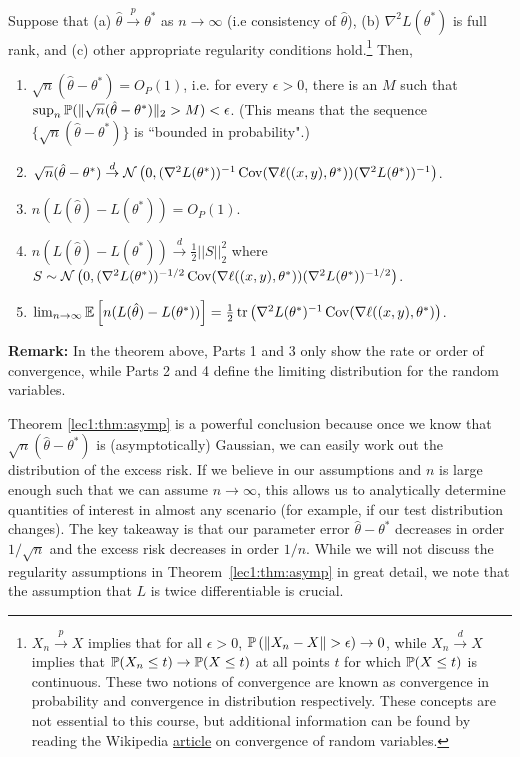 \begin{theorem}
Suppose that (a) $\hat{\theta}  \overset{p}{\to} \theta^{*}$ as $n \to \infty$ (i.e consistency of $\hat{\theta}$), (b) $\nabla^{2}L(\theta^{*})$ is full rank, and  (c) other appropriate regularity conditions hold.\footnote{$X_n \overset{p}{\to} X$ implies that for all $\epsilon > 0$, $\mathbb P \left (\|X_n - X\| > \epsilon \right ) \to 0$, while $X_n \overset{d}{\to} X$ implies that $\mathbb P(X_n \leq t) \to \mathbb P(X \leq t)$ at all points $t$ for which $\mathbb P(X \leq t)$ is continuous. These two notions of convergence are known as convergence in probability and convergence in distribution respectively. These concepts are not essential to this course, but additional information can be found by reading the Wikipedia \href{https://en.wikipedia.org/wiki/Convergence_of_random_variables}{article} on convergence of random variables.} 
Then,
\begin{enumerate}
    \item $\sqrt{n} (\hat{\theta} - \theta^{*}) = O_P(1)$, i.e. for every $\epsilon > 0$, there is an $M$ such that $\sup_n \mathbb P (\| \sqrt{n} (\hat{\theta} - \theta^{*}) \|_2 > M) < \epsilon$. (This means that the sequence $\{ \sqrt{n} (\hat{\theta} - \theta^{*}) \}$ is ``bounded in probability".)
    
    \item  $\sqrt{n}(\hat{\theta}-\theta^{*}) \overset{d}{\to} \mathcal{N} \left(0, (\nabla^{2}L(\theta^{*}))^{-1}\operatorname{Cov}(\nabla \ell((x,y), \theta^*)) (\nabla^{2}L(\theta^{*}))^{-1} \right)$.
     \item $n (L(\hat{\theta}) - L(\theta^{*})) = O_P(1)$.
    \item $n (L(\hat{\theta}) - L(\theta^{*})) \overset{d}{\to} \frac{1}{2} ||S||_{2}^{2}$ where $S \sim \mathcal{N} \left(0, (\nabla^{2}L(\theta^{*}))^{-1/2}\operatorname{Cov}(\nabla \ell((x,y), \theta^*)) (\nabla^{2}L(\theta^{*}))^{-1/2} \right)$.
    \item $\lim_{n \to \infty} \operatorname*{\mathbb{E}} \left[ n (L(\hat \theta) - L(\theta^*)) \right] = \frac12 \operatorname{tr}\left( \nabla^2 L(\theta^*)^{-1} \operatorname{Cov}(\nabla \ell ((x, y), \theta^*) \right)$.
\end{enumerate}
\label{lec1:thm:asymp}
\end{theorem}
\textbf{Remark:} In the theorem above, Parts 1 and 3 only show the rate or order of convergence, while Parts 2 and 4 define the limiting distribution for the random variables.

Theorem \ref{lec1:thm:asymp} is a powerful conclusion because once we know that $\sqrt{n}(\hat \theta  - \theta^*)$ is (asymptotically) Gaussian, we can easily work out the distribution of the excess risk. If we believe in our assumptions and $n$ is large enough such that we can assume $n \to \infty$, this allows us to analytically determine quantities of interest in almost any scenario (for example, if our test distribution changes). The key takeaway is that our parameter error $\hat{\theta} - \theta^*$ decreases in order $1/\sqrt{n}$ and the excess risk decreases in order $1/n$. While we will not discuss the regularity assumptions in Theorem~\ref{lec1:thm:asymp} in great detail, we note that the assumption that $L$ is twice differentiable is crucial. 

